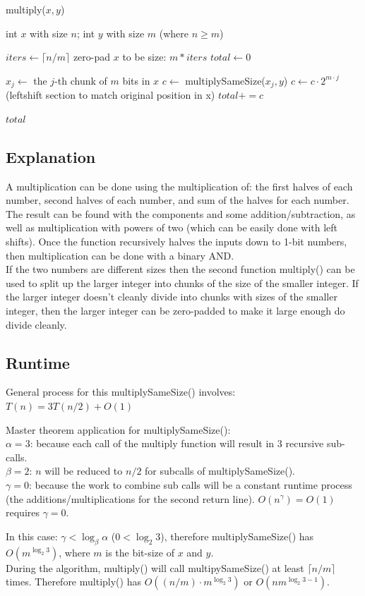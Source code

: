 \documentclass[11pt]{article}
\begin{document}
\begin{algorithm}
\caption{multiply($x, y$)}
\begin{algorithmic} 
\REQUIRE int $x$ with size $n$; int $y$ with size $m$ (where $n \geq m$)

\STATE $iters \leftarrow \lceil n/m \rceil$
\STATE zero-pad $x$ to be size: $m * iters$
\STATE $total \leftarrow 0$

\STATE $x_j \leftarrow $ the $j$-th chunk of $m$ bits in $x$
\STATE $c \leftarrow $ multiplySameSize($x_j, y$)
\STATE $c \leftarrow c \cdot 2^{m \cdot j}$ (leftshift section to match original position in x)
\STATE $total \mathrel{{+}{=}} c$
\ENDFOR

\RETURN $total$

\end{algorithmic}
\end{algorithm}

\subsection*{Explanation}
A multiplication can be done using the multiplication of: the first halves of each number, second halves of each number, and sum of the halves for each number. The result can be found with the components and some addition/subtraction, as well as multiplication with powers of two (which can be easily done with left shifts). Once the function recursively halves the inputs down to 1-bit numbers, then multiplication can be done with a binary AND.\\
If the two numbers are different sizes then the second function multiply() can be used to split up the larger integer into chunks of the size of the smaller integer. If the larger integer doesn't cleanly divide into chunks with sizes of the smaller integer, then the larger integer can be zero-padded to make it large enough do divide cleanly.

\subsection*{Runtime}
General process for this multiplySameSize() involves:\\
$T(n) = 3T(n/2) + O(1)$

\bigskip \noindent Master theorem application for multiplySameSize():\\
$\alpha=3$: because each call of the multiply function will result in 3 recursive sub-calls.\\
$\beta=2$: $n$ will be reduced to $n/2$ for subcalls of multiplySameSize().\\
$\gamma=0$: because the work to combine sub calls will be a constant runtime process (the additions/multiplications for the second return line). $O(n^\gamma)=O(1)$ requires $\gamma=0$.

\medskip \noindent In this case: $\gamma < \log_\beta \alpha$ ($0 < \log_2 3$), therefore multiplySameSize() has $O(m^{\log_2 3})$, where $m$ is the bit-size of $x$ and $y$.\\
During the algorithm, multiply() will call multipySameSize() at least $\lceil n/m \rceil$ times. Therefore multiply() has $O((n/m) \cdot m^{\log_2 3})$ or $O(nm^{\log_2 3 - 1})$.
\end{document}
